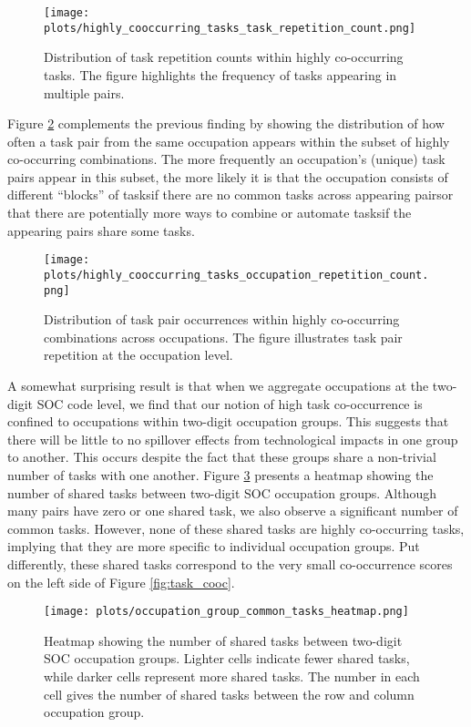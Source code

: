 \documentclass{article}
\theoremstyle{plain}
\theoremstyle{plain}
\begin{document}
\begin{figure}[htbp]
  \centering
  \texttt{[image: plots/highly\_cooccurring\_tasks\_task\_repetition\_count.png]}
  \caption{Distribution of task repetition counts within highly co-occurring tasks. The figure highlights the frequency of tasks appearing in multiple pairs.}
  \label{fig:high_cooc_task}
\end{figure}

Figure \ref{fig:high_cooc_occ} complements the previous finding by showing the distribution of how often a task pair from the same occupation appears within the subset of highly co-occurring combinations.
The more frequently an occupation’s (unique) task pairs appear in this subset, the more likely it is that the occupation consists of different “blocks” of tasks\textemdash if there are no common tasks across appearing pairs\textemdash or that there are potentially more ways to combine or automate tasks\textemdash if the appearing pairs share some tasks.

\begin{figure}[htbp]
  \centering
  \texttt{[image: plots/highly\_cooccurring\_tasks\_occupation\_repetition\_count.png]}
  \caption{Distribution of task pair occurrences within highly co-occurring combinations across occupations. The figure illustrates task pair repetition at the occupation level.}
  \label{fig:high_cooc_occ}
\end{figure}

A somewhat surprising result is that when we aggregate occupations at the two-digit SOC code level, we find that our notion of high task co-occurrence is confined to occupations within two-digit occupation groups. 
This suggests that there will be little to no spillover effects from technological impacts in one group to another.
This occurs despite the fact that these groups share a non-trivial number of tasks with one another. 
Figure \ref{fig:occ_gp_task_heatmap} presents a heatmap showing the number of shared tasks between two-digit SOC occupation groups. 
Although many pairs have zero or one shared task, we also observe a significant number of common tasks. 
However, none of these shared tasks are highly co-occurring tasks, implying that they are more specific to individual occupation groups.
Put differently, these shared tasks correspond to the very small co-occurrence scores on the left side of Figure \ref{fig:task_cooc}.

\begin{figure}[htbp]
  \centering
  \texttt{[image: plots/occupation\_group\_common\_tasks\_heatmap.png]}
  \caption{Heatmap showing the number of shared tasks between two-digit SOC occupation groups. Lighter cells indicate fewer shared tasks, while darker cells represent more shared tasks. The number in each cell gives the number of shared tasks between the row and column occupation group.}
  \label{fig:occ_gp_task_heatmap}
\end{figure}
\end{document}
